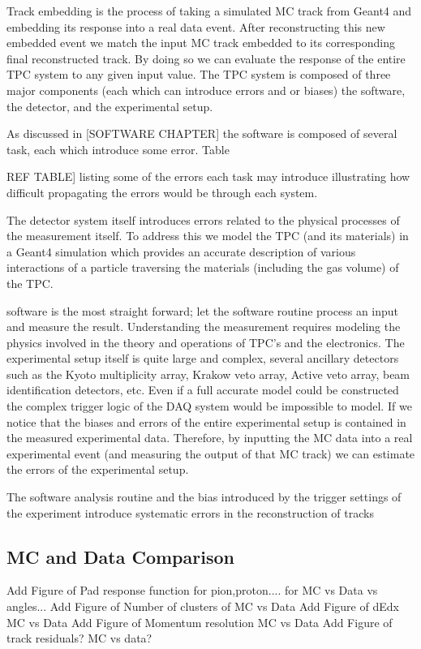 Track embedding is the process of taking a simulated MC track from Geant4 and embedding its response into a real data event. After reconstructing this new embedded event we match the input MC track embedded to its corresponding final reconstructed track.  By doing so we can evaluate the response of the entire TPC system to any given input value. The TPC system is composed of three major components (each which can introduce errors and or biases) the software, the detector, and the experimental setup.  

As discussed in [SOFTWARE CHAPTER] the software is composed of several task, each which introduce some error. Table {REF TABLE] listing some of the errors each task may introduce illustrating how difficult propagating the errors would be through each system. 

The detector system itself introduces errors related to the physical processes of the measurement itself. To address this we model the TPC (and its materials) in a Geant4 simulation which provides an accurate description of various interactions of a particle traversing the materials (including the gas volume) of the TPC. 


 software is the most straight forward; let the software routine process an input and measure the result. Understanding the measurement requires modeling the physics involved in the theory and operations of TPC's and the  electronics. The experimental setup itself is quite large and complex, several ancillary detectors such as the Kyoto multiplicity array, Krakow veto array, Active veto array, beam identification detectors, etc. Even if a full accurate model could be constructed the complex trigger logic of the DAQ system would be impossible to model. If we notice that the biases and errors of the entire experimental setup is contained in the measured experimental data. Therefore, by inputting the MC data into a real experimental event (and measuring the output of that MC track) we can estimate the errors of the experimental setup. 

The software analysis routine and the bias introduced by the trigger settings of the experiment introduce systematic errors in the reconstruction of tracks

\subsection{MC and Data Comparison}
Add Figure of Pad response function for pion,proton.... for MC vs Data vs angles...
Add Figure of Number of clusters of MC vs Data
Add Figure of dEdx MC vs Data
Add Figure of Momentum resolution MC vs Data
Add Figure of track residuals? MC vs data?


}
